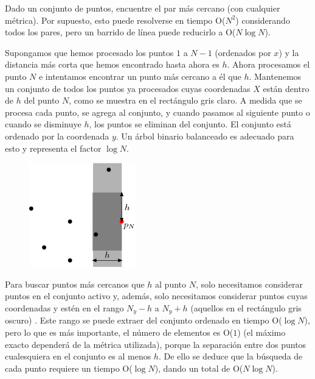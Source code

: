 Dado un conjunto de puntos, encuentre el par más cercano (con cualquier métrica). Por supuesto, esto puede resolverse en tiempo O($N^2$) considerando todos los pares, pero un barrido de línea puede reducirlo a O($N\log N$).

Supongamos que hemos procesado los puntos $1$ a $N-1$ (ordenados por $x$) y la distancia más corta que hemos encontrado hasta ahora es $h$. Ahora procesamos el punto $N$ e intentamos encontrar un punto más cercano a él que $h$. Mantenemos un conjunto de todos los puntos ya procesados cuyas coordenadas $X$ están dentro de $h$ del punto $N$, como se muestra en el rectángulo gris claro. A medida que se procesa cada punto, se agrega al conjunto, y cuando pasamos al siguiente punto o cuando se disminuye $h$, los puntos se eliminan del conjunto. El conjunto está ordenado por la coordenada $y$. Un árbol binario balanceado es adecuado para esto y representa el factor $\log N$.

\begin{figure}[h!]
	\centering
	\includegraphics[width=0.2\linewidth]{img/closest}
	\label{fig:closest}
\end{figure}

Para buscar puntos más cercanos que $h$ al punto $N$, solo necesitamos considerar puntos en el conjunto activo y, además, solo necesitamos considerar puntos cuyas coordenadas y estén en el rango $N_y - h$ a $N_y + h$ (aquellos en el rectángulo gris oscuro) . Este rango se puede extraer del conjunto ordenado en tiempo O($\log N$), pero lo que es más importante, el número de elementos es O($1$) (el máximo exacto dependerá de la métrica utilizada), porque la separación entre dos puntos cualesquiera en el conjunto es al menos $h$. De ello se deduce que la búsqueda de cada punto requiere un tiempo O($\log N$), dando un total de O($N\log N$).